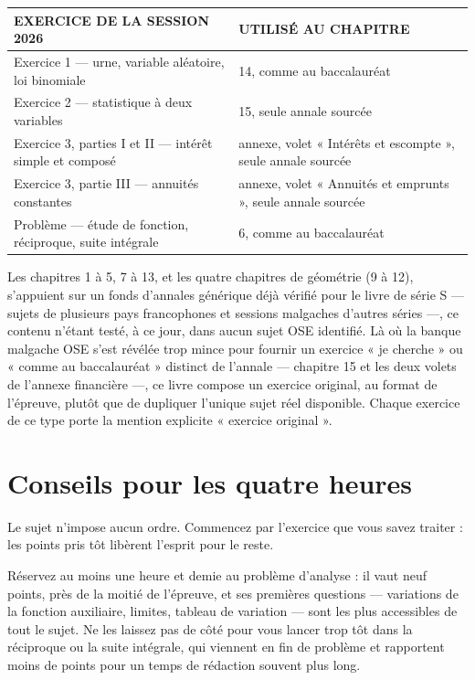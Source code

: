 \begin{center}
\setlength{\tabcolsep}{7pt}
\renewcommand{\arraystretch}{1.3}
\begin{tabular}{@{}L{4.3cm} L{8.4cm}@{}}
\toprule
\textsf{\footnotesize\bfseries EXERCICE DE LA SESSION 2026} &
\textsf{\footnotesize\bfseries UTILISÉ AU CHAPITRE} \\
\midrule
Exercice 1 — urne, variable aléatoire, loi binomiale &
  14, comme au baccalauréat \\
Exercice 2 — statistique à deux variables &
  15, seule annale sourcée \\
Exercice 3, parties I et II — intérêt simple et composé &
  annexe, volet « Intérêts et escompte », seule annale sourcée \\
Exercice 3, partie III — annuités constantes &
  annexe, volet « Annuités et emprunts », seule annale sourcée \\
Problème — étude de fonction, réciproque, suite intégrale &
  6, comme au baccalauréat \\
\bottomrule
\end{tabular}
\end{center}

\noindent
Les chapitres 1 à 5, 7 à 13, et les quatre chapitres de géométrie (9 à 12),
s'appuient sur un fonds d'annales générique déjà vérifié pour le livre de
série S — sujets de plusieurs pays francophones et sessions malgaches
d'autres séries —, ce contenu n'étant testé, à ce jour, dans aucun sujet OSE
identifié. Là où la banque malgache OSE s'est révélée trop mince pour fournir
un exercice « je cherche » ou « comme au baccalauréat » distinct de
l'annale — chapitre 15 et les deux volets de l'annexe financière —, ce
livre compose un exercice original,
au format de l'épreuve, plutôt que de dupliquer l'unique sujet réel
disponible. Chaque exercice de ce type porte la mention explicite
« exercice original ».

\section*{Conseils pour les quatre heures}

Le sujet n'impose aucun ordre. Commencez par l'exercice que vous savez
traiter : les points pris tôt libèrent l'esprit pour le reste.

Réservez au moins une heure et demie au problème d'analyse : il vaut neuf
points, près de la moitié de l'épreuve, et ses premières questions —
variations de la fonction auxiliaire, limites, tableau de variation — sont
les plus accessibles de tout le sujet. Ne les laissez pas de côté pour vous
lancer trop tôt dans la réciproque ou la suite intégrale, qui viennent en
fin de problème et rapportent moins de points pour un temps de rédaction
souvent plus long.

